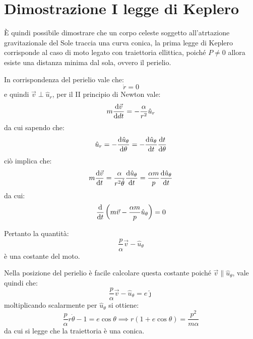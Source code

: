 \documentclass[11pt, a4paper, openright]{book}
\theoremstyle{plain}
\theoremstyle{definition}
\begin{document}
\section{Dimostrazione I legge di Keplero}
È quindi possibile dimostrare che un corpo celeste soggetto all'atrtazione gravitazionale del Sole traccia una curva conica, la prima legge di Keplero corrisponde al caso di moto legato con traiettoria ellittica, poiché $P \not = 0$ allora esiste una distanza minima dal sola, ovvero il perielio.

In corrispondenza del perielio vale che:
\begin{equation}
    \dot{r} = 0
\end{equation}
e quindi $\vec{v} \perp \hat{u}_r$, per il II principio di Newton vale:
\begin{equation}
    m\dv{\vec{v}}{dt} = - \frac{\alpha}{r^2}\hat{u}_r
\end{equation}
da cui sapendo che:
\begin{equation}
    \hat{u}_r = -\dv{\hat{u}_\theta}{\theta} = -\dv{\hat{u}_\theta}{t}\dv{t}{\theta}
\end{equation}
ciò implica che:
\begin{equation}
    m\dv{\vec{v}}{t} = \frac{\alpha}{r^2\dot{\theta}} \dv{\hat{u}_\theta}{t} = \frac{\alpha m}{p}\dv{\hat{u}_\theta}{t} 
\end{equation}
da cui:
\begin{equation}
    \dv{}{t} \left(m\vec{v} - \frac{\alpha m}{p}\hat{u}_\theta\right) = 0
\end{equation}

Pertanto la quantità:
\begin{equation}
    \frac{p}{\alpha}\vec{v} - \hat{u}_\theta
\end{equation}
è una costante del moto.

Nella posizione del perielio è facile calcolare questa costante poiché $\vec{v} \parallel \hat{u}_\theta$, vale quindi che:
\begin{equation}
    \frac{p}{\alpha}\vec{v} - \hat{u}_\theta = e\hat{\jmath}
\end{equation}
moltiplicando scalarmente per $\hat{u}_\theta$ si ottiene:
\begin{equation}
    \frac{p}{\alpha}r\dot{\theta} - 1 = e\cos\theta \implies r(1 + e\cos\theta) = \frac{p^2}{m\alpha}
\end{equation}
da cui si legge che la traiettoria è una conica.
\end{document}
